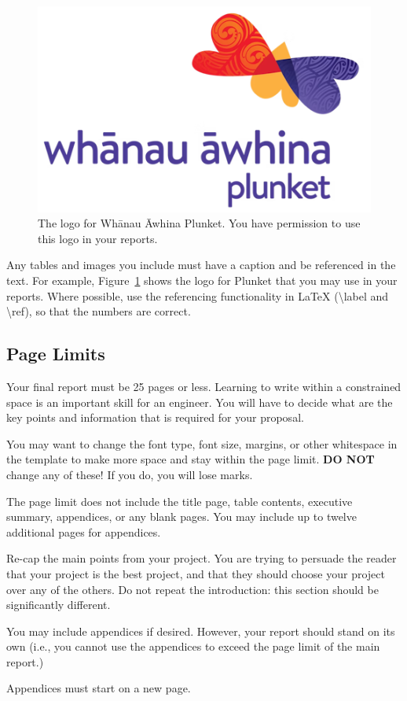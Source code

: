 \documentclass{capstone}
\begin{document}
\begin{figure}[h!]
    \centering
    \includegraphics{plunket-medium}
    \caption{The logo for Whānau Āwhina Plunket. You have permission to use this logo in your reports.}
    \label{fig:logo}
\end{figure}

Any tables and images you include must have a caption and be referenced in the text. For example, Figure~\ref{fig:logo} shows the logo for Plunket that you may use in your reports. Where possible, use the referencing functionality in \LaTeX{} (\textbackslash label and \textbackslash ref), so that the numbers are correct.

\subsection*{Page Limits}

Your final report must be 25 pages or less. Learning to write within a constrained space is an important skill for an engineer. You will have to decide what are the key points and information that is required for your proposal. 

You may want to change the font type, font size, margins, or other whitespace in the template to make more space and stay within the page limit. \textbf{DO NOT} change any of these! If you do, you will lose marks.

The page limit does not include the title page, table contents, executive summary, appendices, or any blank pages. You may include up to twelve additional pages for appendices.


Re-cap the main points from your project. You are trying to persuade the reader that your project is the best project, and that they should choose your project over any of the others. Do not repeat the introduction: this section should be significantly different.

\newpage
{}

You may include appendices if desired. However, your report should stand on its own (i.e., you cannot use the appendices to exceed the page limit of the main report.) 

Appendices must start on a new page.
\end{document}
